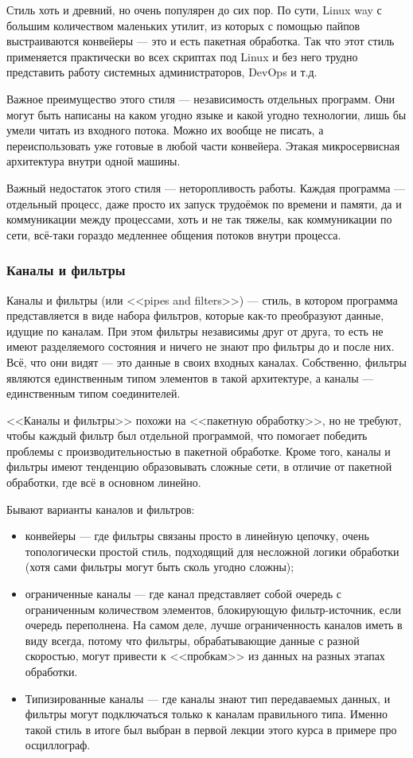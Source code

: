 \documentclass{../../text-style}
\begin{document}
Стиль хоть и древний, но очень популярен до сих пор. По сути, Linux way с большим количеством маленьких утилит, из которых с помощью пайпов выстраиваются конвейеры --- это и есть пакетная обработка. Так что этот стиль применяется практически во всех скриптах под Linux и без него трудно представить работу системных администраторов, DevOps и т.д.

Важное преимущество этого стиля --- независимость отдельных программ. Они могут быть написаны на каком угодно языке и какой угодно технологии, лишь бы умели читать из входного потока. Можно их вообще не писать, а переиспользовать уже готовые в любой части конвейера. Этакая микросервисная архитектура внутри одной машины.

Важный недостаток этого стиля --- неторопливость работы. Каждая программа --- отдельный процесс, даже просто их запуск трудоёмок по времени и памяти, да и коммуникации между процессами, хоть и не так тяжелы, как коммуникации по сети, всё-таки гораздо медленнее общения потоков внутри процесса.

\subsubsection{Каналы и фильтры}

Каналы и фильтры (или <<pipes and filters>>) --- стиль, в котором программа представляется в виде набора фильтров, которые как-то преобразуют данные, идущие по каналам. При этом фильтры независимы друг от друга, то есть не имеют разделяемого состояния и ничего не знают про фильтры до и после них. Всё, что они видят --- это данные в своих входных каналах. Собственно, фильтры являются единственным типом элементов в такой архитектуре, а каналы --- единственным типом соединителей.

<<Каналы и фильтры>> похожи на <<пакетную обработку>>, но не требуют, чтобы каждый фильтр был отдельной программой, что помогает победить проблемы с производительностью в пакетной обработке. Кроме того, каналы и фильтры имеют тенденцию образовывать сложные сети, в отличие от пакетной обработки, где всё в основном линейно.

Бывают варианты каналов и фильтров:

\begin{itemize}
    \item конвейеры --- где фильтры связаны просто в линейную цепочку, очень топологически простой стиль, подходящий для несложной логики обработки (хотя сами фильтры могут быть сколь угодно сложны);
    \item ограниченные каналы --- где канал представляет собой очередь с ограниченным количеством элементов, блокирующую фильтр-источник, если очередь переполнена. На самом деле, лучше ограниченность каналов иметь в виду всегда, потому что фильтры, обрабатывающие данные с разной скоростью, могут привести к <<пробкам>> из данных на разных этапах обработки.
    \item Типизированные каналы --- где каналы знают тип передаваемых данных, и фильтры могут подключаться только к каналам правильного типа. Именно такой стиль в итоге был выбран в первой лекции этого курса в примере про осциллограф.
\end{itemize}
\end{document}
